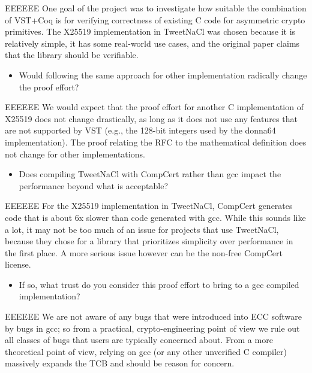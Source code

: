 \begin{answer}{EEEEEE}
    One goal of the project was to investigate how suitable the combination of
    VST+Coq is for verifying correctness of existing C code for asymmetric
    crypto primitives. The X25519 implementation in TweetNaCl was chosen because
    it is relatively simple, it has some real-world use cases, and the original
    paper claims that the library should be verifiable.
\end{answer}

\begin{itemize}
    \item Would following the same approach for other implementation radically change the proof effort?
\end{itemize}

\begin{answer}{EEEEEE}
    We would expect that the proof effort for another C implementation of X25519
    does not change drastically, as long as it does not use any features that are
    not supported by VST (e.g., the 128-bit integers used by the donna64
    implementation). The proof relating the RFC to the mathematical definition
    does not change for other implementations.
\end{answer}

\begin{itemize}
    \item Does compiling TweetNaCl with CompCert rather than gcc impact the performance beyond what is acceptable?
\end{itemize}

\begin{answer}{EEEEEE}
    For the X25519 implementation in TweetNaCl, CompCert generates code that is
    about 6x slower than code generated with gcc. While this sounds like a lot, it
    may not be too much of an issue for projects that use TweetNaCl, because they
    chose for a library that prioritizes simplicity over performance in the first
    place. A more serious issue however can be the non-free CompCert license.
\end{answer}

\begin{itemize}
    \item If so, what trust do you consider this proof effort to bring to a gcc compiled implementation?
\end{itemize}

\begin{answer}{EEEEEE}
    We are not aware of any bugs that were introduced into ECC software by bugs in
    gcc; so from a practical, crypto-engineering point of view we rule out all
    classes of bugs that users are typically concerned about. From a more
    theoretical point of view, relying on gcc (or any other unverified C compiler)
    massively expands the TCB and should be reason for concern.
\end{answer}